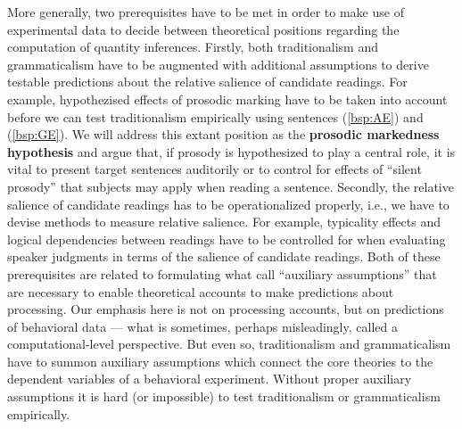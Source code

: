 \documentclass[fleqn,reqno,10pt]{article}
\renewcommand{\mymark}[1]{\textbf{#1}}
\begin{document}
More generally, two prerequisites have to be met in order to make use
of experimental data to decide between theoretical positions regarding
the computation of quantity inferences. Firstly, both traditionalism
and grammaticalism have to be augmented with additional assumptions to
derive testable predictions about the relative salience of candidate
readings. For example, hypothezised effects of prosodic marking have
to be taken into account before we can test traditionalism empirically
using sentences (\ref{bsp:AE}) and (\ref{bsp:GE}).  We will address
this extant position as the \mymark{prosodic markedness hypothesis}
and argue that, if prosody is hypothesized to play a central role, it
is vital to present target sentences auditorily or to control for
effects of “silent prosody” that subjects may apply when reading a
sentence. Secondly, the relative salience of candidate readings has to
be operationalized properly, i.e., we have to devise methods to
measure relative salience. For example, typicality effects and logical
dependencies between readings have to be controlled for when
evaluating speaker judgments in terms of the salience of candidate
readings.  Both of these prerequisites are related to formulating what
\citet{ChemlaSingh2014:Remarks-on-the-} call ``auxiliary assumptions''
that are necessary to enable theoretical accounts to make predictions
about processing. Our emphasis here is not on processing accounts, but
on predictions of behavioral data --- what is sometimes, perhaps
misleadingly, called a computational-level perspective. But even so,
traditionalism and grammaticalism have to summon auxiliary assumptions
which connect the core theories to the dependent variables of a
behavioral experiment. Without proper auxiliary assumptions it is hard
(or impossible) to test traditionalism or grammaticalism empirically.
\end{document}
